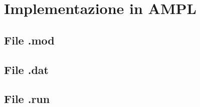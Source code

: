 


	\section{Implementazione in AMPL}
		\subsection{File .mod}
		
		\subsection{File .dat}

		\subsection{File .run}
		\newpage